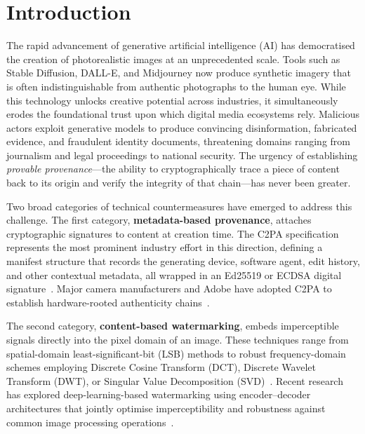 \documentclass[conference]{IEEEtran}
\begin{document}
\section{Introduction}

The rapid advancement of generative artificial intelligence (AI) has
democratised the creation of photorealistic images at an unprecedented
scale.  Tools such as Stable Diffusion, DALL-E, and Midjourney now
produce synthetic imagery that is often indistinguishable from authentic
photographs to the human eye.
While this technology unlocks creative potential across industries, it
simultaneously erodes the foundational trust upon which digital media
ecosystems rely.
Malicious actors exploit generative models to produce convincing
disinformation, fabricated evidence, and fraudulent identity documents,
threatening domains ranging from journalism and legal proceedings to
national security.
The urgency of establishing \textit{provable provenance}—the ability to
cryptographically trace a piece of content back to its origin and verify
the integrity of that chain—has never been greater.

Two broad categories of technical countermeasures have emerged to address
this challenge.
The first category, \textbf{metadata-based provenance}, attaches
cryptographic signatures to content at creation time.
The C2PA specification~\cite{c2pa_spec} represents the most prominent
industry effort in this direction, defining a manifest structure that
records the generating device, software agent, edit history, and other
contextual metadata, all wrapped in an Ed25519 or ECDSA digital
signature~\cite{rosenthol2022c2pa, c2pa_trust, parson2023c2pa}.
Major camera manufacturers and Adobe have adopted C2PA to establish
hardware-rooted authenticity chains~\cite{adobe_content_credentials,
leica_m11_content_credentials}.

The second category, \textbf{content-based watermarking}, embeds
imperceptible signals directly into the pixel domain of an image.
These techniques range from spatial-domain least-significant-bit (LSB)
methods to robust frequency-domain schemes employing Discrete Cosine
Transform (DCT), Discrete Wavelet Transform (DWT), or Singular Value
Decomposition (SVD)~\cite{cox2007digital, fang2020deep,
zhang2023robust_dwt}.
Recent research has explored deep-learning-based watermarking using
encoder–decoder architectures that jointly optimise imperceptibility and
robustness against common image processing operations~\cite{zhu2018hidden,
luo2020distortion_agnostic}.
\end{document}
